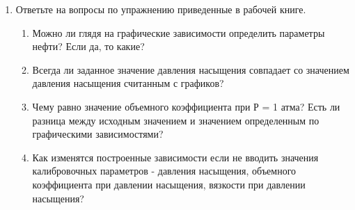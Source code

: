\begin{enumerate}
	функция расчета вязкости воды при заданных термобарических условиях
	
	{ \small  \texttt{=PVT\_Muw\_cP(B23;C23;gamma\_gas\_;gamma\_oil\_;gamma\_wat\_; Rsb\_; Rp\_; Pb\_;Tres\_;Bob\_;muob\_)}}
	
	функция расчета плотности газа при заданных термобарических условиях
	
	{ \small  \texttt{=PVT\_Rhog\_kgm3(B23;C23;gamma\_gas\_;gamma\_oil\_;gamma\_wat\_; Rsb\_; Rp\_; Pb\_;Tres\_;Bob\_;muob\_)}}
	
	функция расчета плотности воды при заданных термобарических условиях
	
	{ \small  \texttt{=PVT\_Rhow\_kgm3(B23;C23;gamma\_gas\_;gamma\_oil\_;gamma\_wat\_; Rsb\_; Rp\_; Pb\_;Tres\_;Bob\_;muob\_)}}
	
	функция расчета плотности нефти при заданных термобарических условиях
	
	{ \small  \texttt{=PVT\_Rhoo\_kgm3(B23;C23;gamma\_gas\_;gamma\_oil\_;gamma\_wat\_; Rsb\_; Rp\_; Pb\_;Tres\_;Bob\_;muob\_)}}
	
	Результаты приведены на рисунке \ref{ris:Ex10_6}
	
	\begin{figure}[h!]
		\center{\texttt{[image: Ex10\_6]}}
		\caption{Результат расчета зависимости свойств пластовых флюидов от давления}
		\label{ris:Ex10_6}
	\end{figure}
	
	\item Ответьте на вопросы по упражнению приведенные в рабочей книге.
	
	\begin{enumerate}
		\item Можно ли глядя на графические зависимости определить параметры нефти? Если да, то какие?
		\item Всегда ли заданное значение давления насыщения совпадает со значением давления насыщения считанным с графиков?
		\item Чему равно значение объемного коэффициента при Р = 1 атма? Есть ли разница между исходным значением и значением определенным по графическими зависимостями?
		\item Как изменятся построенные зависимости если не вводить значения калибровочных параметров - давления насыщения, объемного коэффициента при давлении насыщения, вязкости при давлении насыщения?
		
	\end{enumerate}
 
\end{enumerate}

